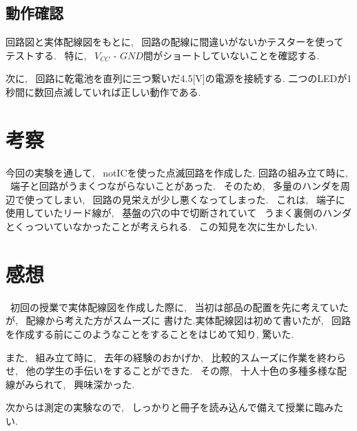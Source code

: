 \documentclass[titlepage, uplatex]{jsarticle}
\begin{document}
	\subsection{動作確認}
		回路図と実体配線図をもとに, ~回路の配線に間違いがないかテスターを使ってテストする.
		~特に, ~$V_{CC}$ - $GND$間がショートしていないことを確認する.

		次に, ~回路に乾電池を直列に三つ繋いだ4.5[V]の電源を接続する.
		二つのLEDが1秒間に数回点滅していれば正しい動作である.

\section{考察}
	今回の実験を通して, ~notICを使った点滅回路を作成した.
	回路の組み立て時に, ~端子と回路がうまくつながらないことがあった.
	~そのため, ~多量のハンダを周辺で使ってしまい, ~回路の見栄えが少し悪くなってしまった.
	~これは, ~端子に使用していたリード線が, ~基盤の穴の中で切断されていて
	~うまく裏側のハンダとくっついていなかったことが考えられる.
	~この知見を次に生かしたい.

\section{感想}
	~初回の授業で実体配線図を作成した際に, ~当初は部品の配置を先に考えていたが, ~配線から考えた方がスムーズに
	書けた.実体配線図は初めて書いたが, ~回路を作成する前にこのようなことをすることをはじめて知り,
	驚いた.

	また, ~組み立て時に, ~去年の経験のおかげか, ~比較的スムーズに作業を終わらせ,
	~他の学生の手伝いをすることができた. ~その際, ~十人十色の多種多様な配線がみられて, ~興味深かった.

	次からは測定の実験なので, ~しっかりと冊子を読み込んで備えて授業に臨みたい.
\end{document}
